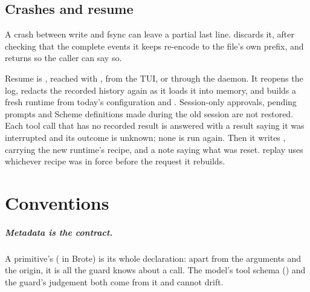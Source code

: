 \section{Crashes and resume}

A crash between write and fsync can leave a partial last line.
 discards it, after checking that the complete events it
keeps re-encode to the file's own prefix, and returns
 so the caller can say so.

Resume is , reached with
, from the TUI, or through the daemon. It reopens
the log, redacts the recorded history again as it loads it into memory,
and builds a fresh runtime from today's configuration and
. Session-only approvals, pending prompts and Scheme
definitions made during the old session are not restored. Each tool call
that has no recorded result is answered with a result saying it was
interrupted and its outcome is unknown; none is run again. Then it writes
, carrying the new runtime's recipe, and a note
saying what was reset.  replay uses whichever recipe was in
force before the request it rebuilds.

\chapter{Conventions}

\paragraph{Metadata is the contract.} A primitive's 
( in Brote) is its whole declaration: apart from the
arguments and the origin, it is all the guard knows about a call. The model's tool schema () and the
guard's judgement both come from it and cannot drift.

